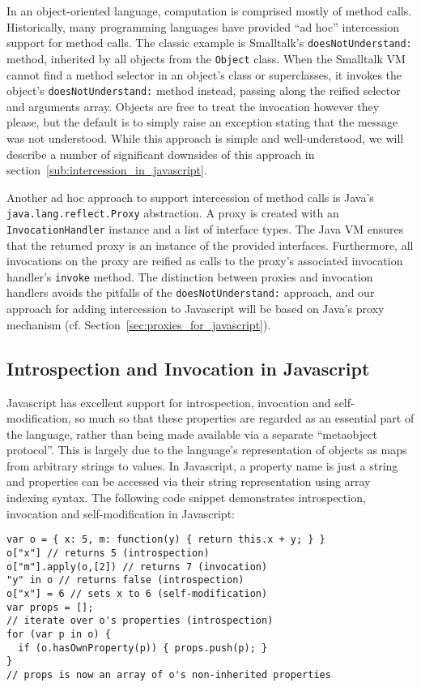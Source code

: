 \documentclass{acm_proc_article-sp}
\begin{document}
In an object-oriented language, computation is comprised mostly of method calls. Historically, many programming languages have provided ``ad hoc'' intercession support for method calls. The classic example is Smalltalk's \texttt{doesNotUnderstand:} method, inherited by all objects from the \texttt{Object} class. When the Smalltalk VM cannot find a method selector in an object's class or superclasses, it invokes the object's \texttt{doesNotUnderstand:} method instead, passing along the reified selector and arguments array. Objects are free to treat the invocation however they please, but the default is to simply raise an exception stating that the message was not understood. While this approach is simple and well-understood, we will describe a number of significant downsides of this approach in section~\ref{sub:intercession_in_javascript}.

Another ad hoc approach to support intercession of method calls is Java's \texttt{java.lang.reflect.Proxy} abstraction. A proxy is created with an \texttt{InvocationHandler} instance and a list of interface types. The Java VM ensures that the returned proxy is an instance of the provided interfaces. Furthermore, all invocations on the proxy are reified as calls to the proxy's associated invocation handler's \texttt{invoke} method. The distinction between proxies and invocation handlers avoids the pitfalls of the \texttt{doesNotUnderstand:} approach, and our approach for adding intercession to Javascript will be based on Java's proxy mechanism (cf. Section~\ref{sec:proxies_for_javascript}).

\subsection{Introspection and Invocation in Javascript}

Javascript has excellent support for introspection, invocation and self-modification, so much so that these properties are regarded as an essential part of the language, rather than being made available via a separate ``metaobject protocol''. This is largely due to the language's representation of objects as maps from arbitrary strings to values. In Javascript, a property name is just a string and properties can be accessed via their string representation using array indexing syntax. The following code snippet demonstrates introspection, invocation and self-modification in Javascript:

\begin{lstlisting}
var o = { x: 5, m: function(y) { return this.x + y; } }
o["x"] // returns 5 (introspection)
o["m"].apply(o,[2]) // returns 7 (invocation)
"y" in o // returns false (introspection)
o["x"] = 6 // sets x to 6 (self-modification)
var props = [];
// iterate over o's properties (introspection)
for (var p in o) {
  if (o.hasOwnProperty(p)) { props.push(p); }
}
// props is now an array of o's non-inherited properties
\end{lstlisting}
\end{document}
